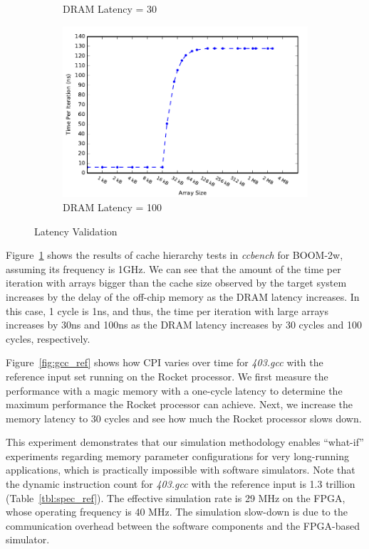\begin{figure}
\begin{subfigure}[t]{0.33\textwidth}
	\caption{DRAM Latency = 30}
\end{subfigure}
\begin{subfigure}[t]{0.33\textwidth}
	\includegraphics[width=\textwidth]{figures/ccbench_lat100.pdf}
	\caption{DRAM Latency = 100}
\end{subfigure}
\caption{Latency Validation}
\label{fig:lat_val}
\end{figure}

Figure~\ref{fig:lat_val} shows the results of cache hierarchy tests in \textit{ccbench}
for BOOM-2w, assuming its frequency is 1GHz. We can see that the amount of
the time per iteration with arrays bigger than the cache size observed by the target system
increases by the delay of the off-chip memory as the DRAM latency increases.
In this case, 1 cycle is 1ns, and thus, the time per iteration with large arrays
increases by 30ns and 100ns as the DRAM latency increases by 30 cycles and 100 cycles,
respectively.

Figure~\ref{fig:gcc_ref} shows how CPI varies over time for \textit{403.gcc} with the reference
input set running on the Rocket processor. We first measure the performance with a
magic memory with a one-cycle latency to determine the maximum performance the Rocket processor can
achieve. Next, we increase the memory latency to 30 cycles and see how much the Rocket processor
slows down.

This experiment demonstrates that our simulation methodology enables ``what-if'' experiments
regarding memory parameter configurations for very long-running applications, which is
practically impossible with software simulators. Note that the dynamic instruction count for
\textit{403.gcc} with the reference input is 1.3 trillion (Table~\ref{tbl:spec_ref}). The
effective simulation rate is 29 MHz on the FPGA, whose operating frequency is 40 MHz. The
simulation slow-down is due to the communication overhead between the software components and the
FPGA-based simulator.

